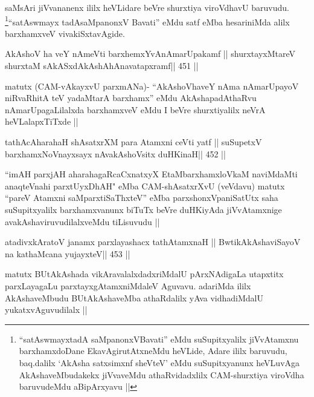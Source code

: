 \begin{artha}
saMsAri jiVvananenx ililx heVLidare beVre shurxtiya viroVdhavU
baruvudu. \footnote[1]{``satAswmayxtadA saMpanonxVBavati'' eMdu suSupitxyalilx jiVvAtamxnu
barxhamxdoDane EkavAgirutAtxneMdu heVLide, Adare ililx baruvudu,
baq.dalilx `AkAsha satxsimxnf sheVteV' eMdu suSupitxyanunx heVLuvAga
AkAshaveMbudakekx jiVvaveMdu athaRvidadxlilx CAM-shurxtiya viroVdha
baruvudeMdu aBipArxyavu ||}``satAswmayx tadAsaMpanonxV Bavati'' eMdu satf eMba
hesariniMda alilx barxhamxveV vivakiSxtavAgide.
\end{artha}


\begin{shl}
AkAshoV ha veY nAmeVti barxhemxYvAnAmarUpakamf ||
shurxtayxMtareV shurxtaM sAkASxdAkAshAhAnavatapxramf\hfill || 451 ||
\end{shl}

\begin{artha}
matutx (CAM-vAkayxvU parxmANa)- ``AkAshoVhaveY nAma nAmarUpayoV
niRvaRhitA teV yadaMtarA barxhamx'' eMdu AkAshapadAthaRvu
nAmarUpagaLilalxda barxhamxveV eMdu I beVre shurxtiyalilx neVrA
heVLalapxTiTxde ||
\end{artha}

\begin{shl}
tathAcAharahaH shAsatxrXM para Atamxni ceVti yatf ||
suSupetxV barxhamxNoV\s nayxsayx nAvakAshoV\s sitx duHKinaH\hfill || 452 ||
\end{shl}

\begin{artha}
``imAH parxjAH aharahagaRcaCxnatxyX EtaMbarxhamxloVkaM naviMdaMti
  anaqteVnahi parxtUyxDhAH" eMba CAM-shAsatxrXvU (veVdavu) matutx
  ``pareV Atamxni saMparxtiSaThxteV'' eMba parxshonxVpaniSatUtx saha
  suSupitxyalilx barxhamxvanunx biTuTx beVre duHKiyAda jiVvAtamxnige
  avakAshaviruvudilalxveMdu tiLisuvudu ||
\end{artha}

\begin{shl}
atadivxkAratoV janamx parxlayashacx tathA\s\s tamxnaH ||
BwtikAkAshaviSayoV na kathaMcana yujayxteV\hfill || 453 ||
\end{shl}

\begin{artha}
matutx BUtAkAshada vikAravalalxdadxriMdalU pArxNAdigaLa utapxtitx
parxLayagaLu parxtayxgAtamxniMdaleV Aguvavu. adariMda ililx
AkAshaveMbudu BUtAkAshaveMba athaRdalilx yAva vidhadiMdalU
yukatxvAguvudilalx ||
\end{artha}



